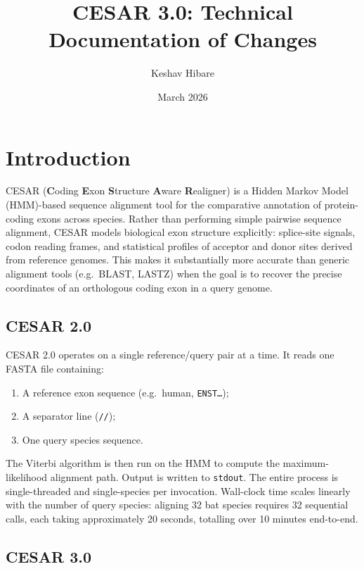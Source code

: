 \documentclass[12pt,a4paper]{article}
\title{\textbf{CESAR 3.0: Technical Documentation of Changes}}
\author{Keshav Hibare}
\date{March 2026}
\begin{document}
\maketitle
\tableofcontents
\newpage

\section{Introduction}

CESAR (\textbf{C}oding \textbf{E}xon \textbf{S}tructure \textbf{A}ware \textbf{R}ealigner)
is a Hidden Markov Model (HMM)-based sequence alignment tool for the comparative annotation
of protein-coding exons across species. Rather than performing simple pairwise sequence
alignment, CESAR models biological exon structure explicitly: splice-site signals, codon
reading frames, and statistical profiles of acceptor and donor sites derived from reference
genomes. This makes it substantially more accurate than generic alignment tools (e.g.\
BLAST, LASTZ) when the goal is to recover the precise coordinates of an orthologous coding
exon in a query genome.

\subsection{CESAR 2.0}

CESAR 2.0 operates on a single reference/query pair at a time. It reads one FASTA file
containing:
\begin{enumerate}
  \item A reference exon sequence (e.g.\ human, \texttt{ENST\ldots});
  \item A separator line (\texttt{//});
  \item One query species sequence.
\end{enumerate}
The Viterbi algorithm is then run on the HMM to compute the maximum-likelihood alignment
path. Output is written to \texttt{stdout}. The entire process is single-threaded and
single-species per invocation. Wall-clock time scales linearly with the number of query
species: aligning 32 bat species requires 32 sequential calls, each taking approximately
20 seconds, totalling over 10 minutes end-to-end.

\subsection{CESAR 3.0}
\end{document}
